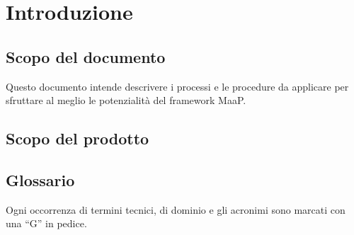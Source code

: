 \section{Introduzione}

	\subsection{Scopo del documento}
	Questo documento intende descrivere i processi e le procedure da applicare per sfruttare al meglio le potenzialità del framework MaaP.

	\subsection{Scopo del prodotto}
	\ScopoDelProdotto

	\subsection{Glossario}
	Ogni occorrenza di termini tecnici, di dominio e gli acronimi sono marcati con una ``G'' in pedice.


	


